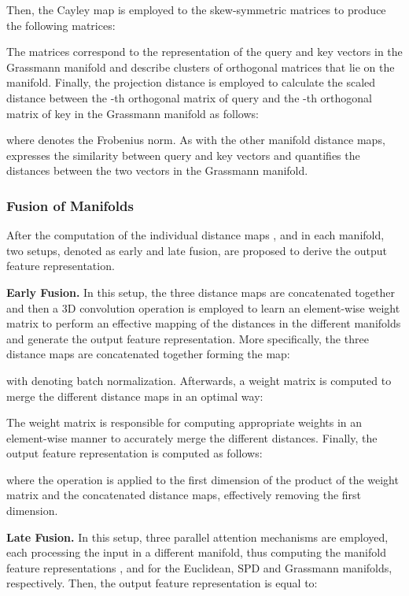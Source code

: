 \documentclass[10pt,twocolumn,letterpaper]{article}
\begin{document}
Then, the Cayley map is employed to the skew-symmetric matrices to produce the following matrices:



The matrices  correspond to the representation of the query and key vectors in the Grassmann manifold and describe clusters of  orthogonal matrices that lie on the manifold. Finally, the projection distance is employed to calculate the scaled distance between the -th orthogonal matrix of query and the -th orthogonal matrix of key in the Grassmann manifold as follows:



where  denotes the Frobenius norm. As with the other manifold distance maps,  expresses the similarity between query and key vectors and quantifies the distances between the two vectors in the Grassmann manifold.

\subsubsection{Fusion of Manifolds}

After the computation of the individual distance maps ,  and  in each manifold, two setups, denoted as early and late fusion, are proposed to derive the output feature representation.

\textbf{Early Fusion.} In this setup, the three distance maps are concatenated together and then a 3D convolution operation  is employed to learn an element-wise weight matrix to perform an effective mapping of the distances in the different manifolds and generate the output feature representation. More specifically, the three distance maps are concatenated together forming the map:



with  denoting batch normalization. Afterwards, a weight matrix is computed to merge the different distance maps in an optimal way:



The weight matrix  is responsible for computing appropriate weights in an element-wise manner to accurately merge the different distances. Finally, the output feature representation  is computed as follows:



where the  operation is applied to the first dimension of the product of the weight matrix and the concatenated distance maps, effectively removing the first dimension.

\textbf{Late Fusion.} In this setup, three parallel attention mechanisms are employed, each processing the input in a different manifold, thus computing the manifold feature representations ,  and  for the Euclidean, SPD and Grassmann manifolds, respectively. Then, the output feature representation  is equal to:
\end{document}
